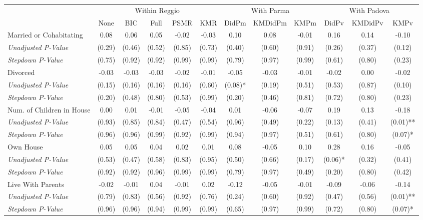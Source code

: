 \begin{tabular}{l c c c c c c c c c c c}
\toprule
& \multicolumn{5}{c}{Within Reggio} & \multicolumn{3}{c}{With Parma} & \multicolumn{3}{c}{With Padova} \\\cmidrule(lr){2-6} \cmidrule(lr){7-9} \cmidrule(lr){10-12}
 & None & BIC & Full & PSMR & KMR & DidPm & KMDidPm & KMPm & DidPv & KMDidPv & KMPv \\
\midrule
Married or Cohabitating & 0.08 & 0.06 & 0.05 & -0.02 & -0.03 & 0.10 & 0.08 & -0.01 & 0.16 & 0.14 & -0.10 \\
\quad \textit{Unadjusted P-Value} & (0.29) & (0.46) & (0.52) & (0.85) & (0.73) & (0.40) & (0.60) & (0.91) & (0.26) & (0.37) & (0.12) \\
\quad \textit{Stepdown P-Value} & (0.75) & (0.92) & (0.92) & (0.99) & (0.99) & (0.79) & (0.97) & (0.99) & (0.61) & (0.80) & (0.23) \\
Divorced & -0.03 & -0.03 & -0.03 & -0.02 & -0.01 & -0.05 & -0.03 & -0.01 & -0.02 & 0.00 & -0.02 \\
\quad \textit{Unadjusted P-Value} & (0.15) & (0.16) & (0.16) & (0.16) & (0.60) & (0.08)* & (0.19) & (0.51) & (0.53) & (0.87) & (0.10) \\
\quad \textit{Stepdown P-Value} & (0.20) & (0.48) & (0.80) & (0.53) & (0.99) & (0.20) & (0.46) & (0.81) & (0.72) & (0.80) & (0.23) \\
Num. of Children in House & 0.00 & 0.01 & -0.01 & -0.05 & -0.04 & 0.01 & -0.06 & -0.07 & 0.19 & 0.13 & -0.18 \\
\quad \textit{Unadjusted P-Value} & (0.93) & (0.85) & (0.84) & (0.47) & (0.54) & (0.96) & (0.49) & (0.22) & (0.13) & (0.41) & (0.01)** \\
\quad \textit{Stepdown P-Value} & (0.96) & (0.96) & (0.99) & (0.92) & (0.99) & (0.94) & (0.97) & (0.51) & (0.61) & (0.80) & (0.07)* \\
Own House & 0.05 & 0.05 & 0.04 & 0.02 & 0.01 & 0.08 & -0.05 & 0.10 & 0.28 & 0.16 & -0.05 \\
\quad \textit{Unadjusted P-Value} & (0.53) & (0.47) & (0.58) & (0.83) & (0.95) & (0.50) & (0.66) & (0.17) & (0.06)* & (0.32) & (0.41) \\
\quad \textit{Stepdown P-Value} & (0.92) & (0.92) & (0.96) & (0.99) & (0.99) & (0.79) & (0.97) & (0.49) & (0.20) & (0.80) & (0.42) \\
Live With Parents & -0.02 & -0.01 & 0.04 & -0.01 & 0.02 & -0.12 & -0.05 & -0.01 & -0.09 & -0.06 & -0.14 \\
\quad \textit{Unadjusted P-Value} & (0.79) & (0.83) & (0.56) & (0.92) & (0.76) & (0.24) & (0.60) & (0.92) & (0.47) & (0.56) & (0.01)** \\
\quad \textit{Stepdown P-Value} & (0.96) & (0.96) & (0.94) & (0.99) & (0.99) & (0.65) & (0.97) & (0.99) & (0.72) & (0.80) & (0.07)* \\
\bottomrule
\end{tabular}

